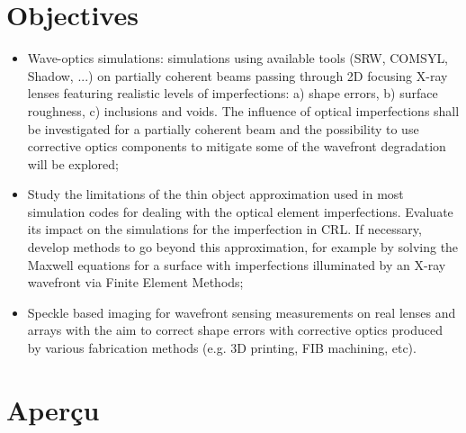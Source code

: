 \section*{Objectives}

\begin{itemize}
\item Wave-optics simulations: simulations using available tools (SRW, COMSYL, Shadow, ...) on partially coherent beams passing through 2D focusing X-ray lenses featuring realistic levels of imperfections: a) shape errors, b) surface roughness, c) inclusions and voids. The influence of optical imperfections shall be investigated for a partially coherent beam and the possibility to use corrective optics components to mitigate some of the wavefront degradation will be explored;

\item Study the limitations of the thin object approximation used in most simulation codes for dealing with the optical element imperfections. Evaluate its impact on the simulations for the imperfection in CRL. If necessary, develop methods to go beyond this approximation, for example by solving the Maxwell equations for a surface with imperfections illuminated by an X-ray wavefront via Finite Element Methods;
	
\item Speckle based imaging for wavefront sensing measurements on real lenses and arrays with the aim to correct shape errors with corrective optics produced by various fabrication methods (e.g. 3D printing, FIB machining, etc).
	
\end{itemize}

\section*{Aperçu}

